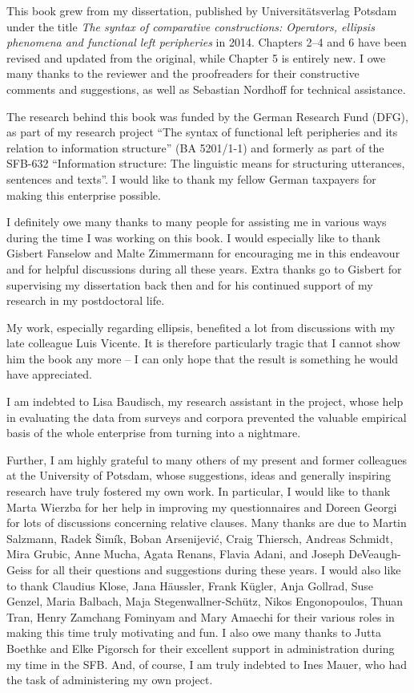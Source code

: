 \begin{refsection}

This book grew from my dissertation, published by Universitätsverlag Potsdam under the title \textit{The syntax of comparative constructions: Operators, ellipsis phenomena and functional left peripheries} in 2014. Chapters 2--4 and 6 have been revised and updated from the original, while Chapter 5 is entirely new. I owe many thanks to the reviewer and the proofreaders for their constructive comments and suggestions, as well as Sebastian Nordhoff for technical assistance.

The research behind this book was funded by the German Research Fund (DFG), as part of my research project ``The syntax of functional left peripheries and its relation to information structure'' (BA 5201/1-1) and formerly as part of the SFB-632 ``Information structure: The linguistic means for structuring utterances, sentences and texts''. I would like to thank my fellow German taxpayers for making this enterprise possible.

I definitely owe many thanks to many people for assisting me in various ways during the time I was working on this book. I would especially like to thank Gisbert Fanselow and Malte Zimmermann for encouraging me in this endeavour and for helpful discussions during all these years. Extra thanks go to Gisbert for supervising my dissertation back then and for his continued support of my research in my postdoctoral life.

My work, especially regarding ellipsis, benefited a lot from discussions with my late colleague Luis Vicente. It is therefore particularly tragic that I cannot show him the book any more -- I can only hope that the result is something he would have appreciated.

I am indebted to Lisa Baudisch, my research assistant in the project, whose help in evaluating the data from surveys and corpora prevented the valuable empirical basis of the whole enterprise from turning into a nightmare.

Further, I am highly grateful to many others of my present and former colleagues at the University of Potsdam, whose suggestions, ideas and generally inspiring research have truly fostered my own work. In particular, I would like to thank Marta Wierzba for her help in improving my questionnaires and Doreen Georgi for lots of discussions concerning relative clauses. Many thanks are due to Martin Salzmann, Radek Šimík, Boban Arsenijević, Craig Thiersch, Andreas Schmidt, Mira Grubic, Anne Mucha, Agata Renans, Flavia Adani, and Joseph DeVeaugh-Geiss for all their questions and suggestions during these years. I would also like to thank Claudius Klose, Jana Häussler, Frank Kügler, Anja Gollrad, Suse Genzel, Maria Balbach,
Maja Stegenwallner-Schütz, 
Nikos Engonopoulos, 
Thuan Tran, Henry Zamchang Fominyam and Mary Amaechi for their various roles in making this time truly motivating and fun. I also owe many thanks to Jutta Boethke and Elke Pigorsch for their excellent support in administration during my time in the SFB. And, of course, I am truly indebted to Ines Mauer, who had the task of administering my own project.


\end{refsection}
